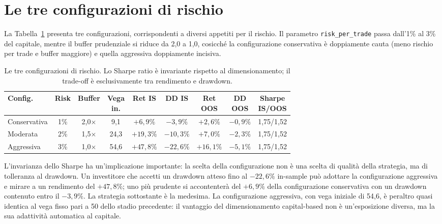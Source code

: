 \section{Le tre configurazioni di rischio}
\label{sec:mm-configurazioni}

La Tabella~\ref{tab:configurazioni-rischio} presenta tre configurazioni,
corrispondenti a diversi appetiti per il rischio. Il parametro
\texttt{risk\_per\_trade} passa dall'1\% al 3\% del capitale, mentre il
buffer prudenziale si riduce da 2,0 a 1,0, cosicché la configurazione
conservativa è doppiamente cauta (meno rischio per trade e buffer maggiore)
e quella aggressiva doppiamente incisiva.

\begin{table}[H]
\centering
\caption{Le tre configurazioni di rischio. Lo Sharpe ratio è invariante
rispetto al dimensionamento; il trade-off è esclusivamente tra rendimento e
drawdown.}
\label{tab:configurazioni-rischio}
\small
\setlength{\tabcolsep}{4pt}
\begin{tabular}{lcccccccc}
\toprule
\textbf{Config.} & \textbf{Risk} & \textbf{Buffer} & \makecell{\textbf{Vega}\\\textbf{in.}} & \textbf{Ret IS} & \textbf{DD IS} & \makecell{\textbf{Ret}\\\textbf{OOS}} & \makecell{\textbf{DD}\\\textbf{OOS}} & \makecell{\textbf{Sharpe}\\\textbf{IS/OOS}} \\
\midrule
Conservativa & 1\% & 2,0$\times$ & 9,1  & $+6{,}9\%$  & $-3{,}9\%$  & $+2{,}6\%$  & $-0{,}9\%$ & 1,75/1,52 \\
Moderata     & 2\% & 1,5$\times$ & 24,3 & $+19{,}3\%$ & $-10{,}3\%$ & $+7{,}0\%$  & $-2{,}3\%$ & 1,75/1,52 \\
Aggressiva   & 3\% & 1,0$\times$ & 54,6 & $+47{,}8\%$ & $-22{,}6\%$ & $+16{,}1\%$ & $-5{,}1\%$ & 1,75/1,52 \\
\bottomrule
\end{tabular}
\end{table}

L'invarianza dello Sharpe ha un'implicazione importante: la scelta della
configurazione non è una scelta di qualità della strategia, ma di
tolleranza al drawdown. Un investitore che accetti un drawdown atteso fino
al $-22{,}6\%$ in-sample può adottare la configurazione aggressiva e mirare
a un rendimento del $+47{,}8\%$; uno più prudente si accontenterà del
$+6{,}9\%$ della configurazione conservativa con un drawdown contenuto entro
il $-3{,}9\%$. La strategia sottostante è la medesima. La configurazione
aggressiva, con vega iniziale di 54,6, è peraltro quasi identica al vega
fisso pari a 50 dello stadio precedente: il vantaggio del dimensionamento
capital-based non è un'esposizione diversa, ma la sua adattività automatica
al capitale.

